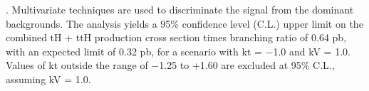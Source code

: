 



. Multivariate techniques are used to discriminate the signal from the dominant backgrounds. The analysis yields a 95\% confidence level (C.L.) upper limit on the combined tH + ttH production cross section times branching ratio of 0.64 pb, with an expected limit of 0.32 pb, for a scenario with kt = −1.0 and kV = 1.0. Values of kt outside the range of −1.25 to +1.60 are excluded at 95\% C.L., assuming kV = 1.0.






